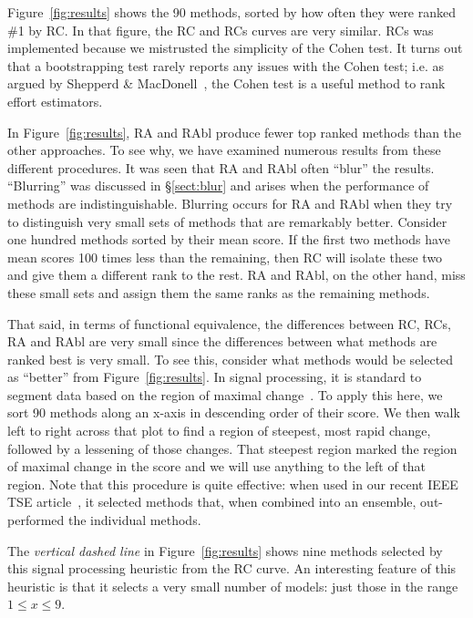 \documentclass{sig-alternate}
\newcommand{\tion}[1]{\S\ref{sect:#1}}
\newcommand{\fig}[1]{Figure~\ref{fig:#1}}
\begin{document}
\fig{results} shows  the 90 methods, sorted by how often they were
ranked \#1 by RC. 
In that figure, the RC and RCs curves are very similar.
RCs was implemented because we  mistrusted the simplicity of
the Cohen test. It turns out that a bootstrapping test rarely reports
any issues with the Cohen test; i.e. as argued by Shepperd \& MacDonell~\cite{shepperd12},
the Cohen test is a useful method to rank effort estimators. 


In \fig{results},
RA and RAbl produce  fewer
top ranked methods than the other approaches.
To see why,
we have examined 
numerous results from these different procedures.
It was seen that RA and RAbl often ``blur'' the results.
``Blurring'' was discussed in \tion{blur} and arises when the performance
of methods are indistinguishable. Blurring occurs for  
RA and RAbl when they try to distinguish very small sets of
methods that are remarkably better.  Consider one hundred
methods sorted by their mean score. If the first two methods
have mean scores 100 times less than the remaining, then RC will
isolate these two and give them a different rank to the rest.  RA and
RAbl, on the other hand, miss these small sets and assign them the
same ranks as the remaining methods.  

That said, in terms of functional equivalence, the differences between
RC, RCs, RA and RAbl are very small since the differences between
what methods are ranked best is very small.
To see this, consider what methods would be selected as ``better''
from \fig{results}.
In signal processing, it is standard  to segment data based on 
the region of maximal change~\cite{oppen96}. To apply this here, we 
sort 90 methods along an x-axis
in descending order of their score.
We then walk left to right across that plot
to find a region of steepest, most rapid change, followed by a 
lessening of those changes.
That steepest region marked the region of maximal change in the score and we will
use anything to the left of that region.
Note that this  procedure is quite effective: when  used in our recent IEEE TSE
article~\cite{me11a}, it selected methods that, when combined into an ensemble, out-performed
the individual methods.

The {\em vertical dashed line} in \fig{results}  shows
nine methods selected by this signal processing heuristic
from the RC curve.
An interesting feature of this heuristic is that it selects a very
small number of models: just those in the range 
\mbox{$1 \le x \le 9$}.
\end{document}
